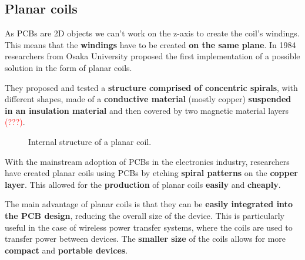 \subsection{Planar coils}
As PCBs are 2D objects we can't work on the z-axis to create the coil's windings. This means that the \textbf{windings} have to be created \textbf{on the same plane}. 
In 1984 researchers from Osaka University proposed the first implementation of a possible solution in the form of planar coils.

\begin{samepage}
    They proposed and tested a \textbf{structure comprised of concentric spirals}, with different shapes, made of a \textbf{conductive material} (mostly copper) \textbf{suspended in an insulation material} and then covered by two magnetic material layers \textcolor{red}{(???)}\cite{OG_plan_coils}. %
    \nopagebreak

    \begin{figure}[H]
        \centering
        \resizebox{.7\linewidth}{!}{
            
        }
        \caption{Internal structure of a planar coil.}
        \label{fig:Planar_coil_structure}
    \end{figure}
\end{samepage}

With the mainstream adoption of PCBs in the electronics industry, researchers have created planar coils using PCBs by etching \textbf{spiral patterns} on the \textbf{copper layer}. This allowed for the \textbf{production} of planar coils \textbf{easily} and \textbf{cheaply}.

The main advantage of planar coils is that they can be \textbf{easily integrated into the PCB design}, reducing the overall size of the device. This is particularly useful in the case of wireless power transfer systems, where the coils are used to transfer power between devices. The \textbf{smaller size} of the coils allows for more \textbf{compact} and \textbf{portable devices}.

